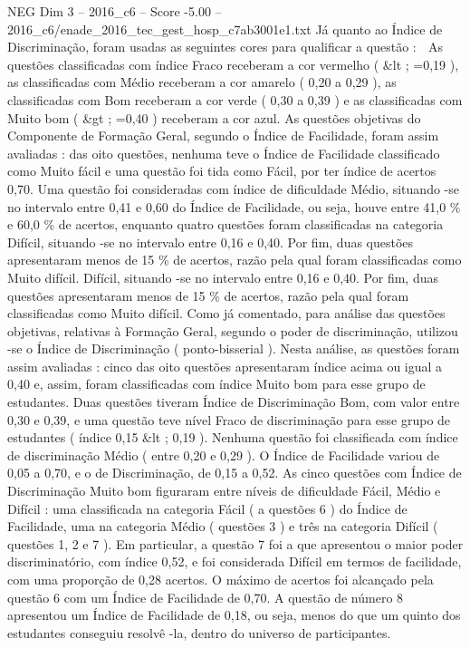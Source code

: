 \begin{textsample}{NEG Dim 3 – 2016\_c6 – Score -5.00 – 2016\_c6/enade\_2016\_tec\_gest\_hosp\_c7ab3001e1.txt}
Já quanto ao Índice de Discriminação, foram usadas as seguintes cores para qualificar a questão :  As questões classificadas com índice Fraco receberam a cor vermelho ( \&lt ; =0,19 ), as classificadas com Médio receberam a cor amarelo ( 0,20 a 0,29 ), as classificadas com Bom receberam a cor verde ( 0,30 a 0,39 ) e as classificadas com Muito bom ( \&gt ; =0,40 ) receberam a cor azul.
As questões objetivas do Componente de Formação Geral, segundo o Índice de Facilidade, foram assim avaliadas : das oito questões, nenhuma teve o Índice de Facilidade classificado como Muito fácil e uma questão foi tida como Fácil, por ter índice de acertos 0,70.
Uma questão foi consideradas com índice de dificuldade Médio, situando -se no intervalo entre 0,41 e 0,60 do Índice de Facilidade, ou seja, houve entre 41,0 \% e 60,0 \% de acertos, enquanto quatro questões foram classificadas na categoria Difícil, situando -se no intervalo entre 0,16 e 0,40.
Por fim, duas questões apresentaram menos de 15 \% de acertos, razão pela qual foram classificadas como Muito difícil.
Difícil, situando -se no intervalo entre 0,16 e 0,40.
Por fim, duas questões apresentaram menos de 15 \% de acertos, razão pela qual foram classificadas como Muito difícil.
Como já comentado, para análise das questões objetivas, relativas à Formação Geral, segundo o poder de discriminação, utilizou -se o Índice de Discriminação ( ponto-bisserial ).
Nesta análise, as questões foram assim avaliadas : cinco das oito questões apresentaram índice acima ou igual a 0,40 e, assim, foram classificadas com índice Muito bom para esse grupo de estudantes.
Duas questões tiveram Índice de Discriminação Bom, com valor entre 0,30 e 0,39, e uma questão teve nível Fraco de discriminação para esse grupo de estudantes ( índice 0,15 \&lt ; 0,19 ).
Nenhuma questão foi classificada com índice de discriminação Médio ( entre 0,20 e 0,29 ).
O Índice de Facilidade variou de 0,05 a 0,70, e o de Discriminação, de 0,15 a 0,52.
As cinco questões com Índice de Discriminação Muito bom figuraram entre níveis de dificuldade Fácil, Médio e Difícil : uma classificada na categoria Fácil ( a questões 6 ) do Índice de Facilidade, uma na categoria Médio ( questões 3 ) e três na categoria Difícil ( questões 1, 2 e 7 ).
Em particular, a questão 7 foi a que apresentou o maior poder discriminatório, com índice 0,52, e foi considerada Difícil em termos de facilidade, com uma proporção de 0,28 acertos.
O máximo de acertos foi alcançado pela questão 6 com um Índice de Facilidade de 0,70.
A questão de número 8 apresentou um Índice de Facilidade de 0,18, ou seja, menos do que um quinto dos estudantes conseguiu resolvê -la, dentro do universo de participantes.

\end{textsample}
